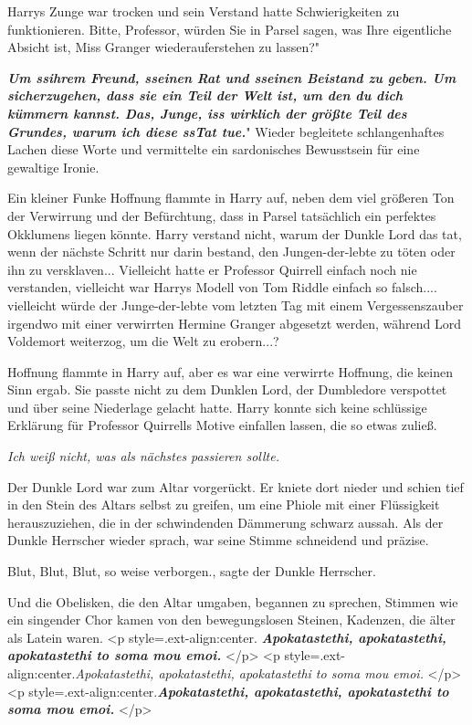 Harrys Zunge war trocken und sein Verstand hatte Schwierigkeiten zu
funktionieren. \glqq Bitte, Professor, würden Sie in Parsel sagen, was Ihre
eigentliche Absicht ist, Miss Granger wiederauferstehen zu lassen?"

\glqq \textbf{\emph{Um ssihrem Freund, sseinen Rat und sseinen Beistand zu
geben. Um sicherzugehen, dass sie ein Teil der Welt ist, um den du dich kümmern
kannst. Das, Junge, iss wirklich der größte Teil des Grundes, warum ich diese
ssTat tue.}}" Wieder begleitete schlangenhaftes Lachen diese Worte und
vermittelte ein sardonisches Bewusstsein für eine gewaltige Ironie.

Ein kleiner Funke Hoffnung flammte in Harry auf, neben dem viel größeren Ton der
Verwirrung und der Befürchtung, dass in Parsel tatsächlich ein perfektes
Okklumens liegen könnte. Harry verstand nicht, warum der Dunkle Lord das tat,
wenn der nächste Schritt nur darin bestand, den Jungen-der-lebte zu töten oder
ihn zu versklaven... Vielleicht hatte er Professor Quirrell einfach noch nie
verstanden, vielleicht war Harrys Modell von Tom Riddle einfach so falsch....
vielleicht würde der Junge-der-lebte vom letzten Tag mit einem Vergessenszauber
irgendwo mit einer verwirrten Hermine Granger abgesetzt werden, während Lord
Voldemort weiterzog, um die Welt zu erobern...?

Hoffnung flammte in Harry auf, aber es war eine verwirrte Hoffnung, die keinen
Sinn ergab. Sie passte nicht zu dem Dunklen Lord, der Dumbledore verspottet und
über seine Niederlage gelacht hatte. Harry konnte sich keine schlüssige
Erklärung für Professor Quirrells Motive einfallen lassen, die so etwas zuließ.

\emph{Ich weiß nicht, was als nächstes passieren sollte.}

Der Dunkle Lord war zum Altar vorgerückt. Er kniete dort nieder und schien tief
in den Stein des Altars selbst zu greifen, um eine Phiole mit einer Flüssigkeit
herauszuziehen, die in der schwindenden Dämmerung schwarz aussah. Als der Dunkle
Herrscher wieder sprach, war seine Stimme schneidend und präzise.

\glqq Blut, Blut, Blut, so weise verborgen.\grqq{}, sagte der Dunkle Herrscher.

Und die Obelisken, die den Altar umgaben, begannen zu sprechen, Stimmen wie ein
singender Chor kamen von den bewegungslosen Steinen, Kadenzen, die älter als
Latein waren. <p style=\grqq{}.ext-align:center\grqq{}.\textbf{\emph{
Apokatastethi, apokatastethi, apokatastethi to soma mou emoi. }}</p> <p
style=\grqq{}.ext-align:center\grqq{}.\emph{Apokatastethi, apokatastethi,
apokatastethi to soma mou emoi. }</p> <p
style=\grqq{}.ext-align:center\grqq{}.\textbf{\emph{Apokatastethi,
apokatastethi, apokatastethi to soma mou emoi. }}</p>


